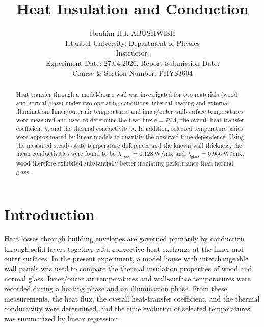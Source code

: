\documentclass[journal]{IEEEtran}
\begin{document}
\title{Heat Insulation and Conduction}
\author{Ibrahim H.I. ABUSHWISH \\
Istanbul University, Department of Physics \\
Instructor: \\
Experiment Date: 27.04.2026, Report Submission Date: \\
Course \& Section Number: PHYS3604}


\maketitle

\begin{abstract}
Heat transfer through a model-house wall was investigated for two materials (wood and normal glass) under two operating conditions: internal heating and external illumination. Inner/outer air temperatures and inner/outer wall-surface temperatures were measured and used to determine the heat flux $q=P/A$, the overall heat-transfer coefficient $k$, and the thermal conductivity $\lambda$. In addition, selected temperature series were approximated by linear models to quantify the observed time dependence. Using the measured steady-state temperature differences and the known wall thickness, the mean conductivities were found to be $\lambda_{\mathrm{wood}}=\SI{0.128}{\watt\per\meter\kelvin}$ and $\lambda_{\mathrm{glass}}=\SI{0.956}{\watt\per\meter\kelvin}$; wood therefore exhibited substantially better insulating performance than normal glass.
\end{abstract}

\section{Introduction}
Heat losses through building envelopes are governed primarily by conduction through solid layers together with convective heat exchange at the inner and outer surfaces. In the present experiment, a model house with interchangeable wall panels was used to compare the thermal insulation properties of wood and normal glass. Inner/outer air temperatures and wall-surface temperatures were recorded during a heating phase and an illumination phase. From these measurements, the heat flux, the overall heat-transfer coefficient, and the thermal conductivity were determined, and the time evolution of selected temperatures was summarized by linear regression.
\end{document}

